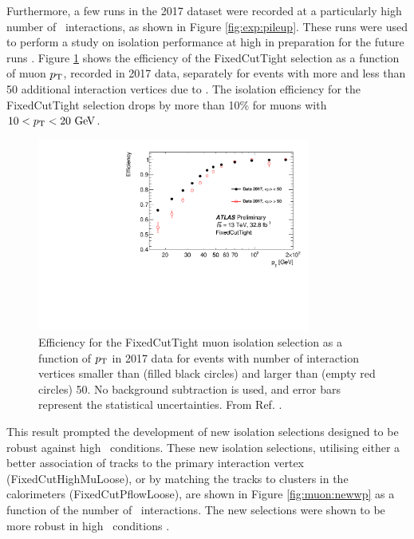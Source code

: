 Furthermore, a few runs in the 2017 dataset were recorded at a particularly high
number of \pileup~interactions, as shown in Figure \ref{fig:exp:pileup}.
These runs were used to perform a study on isolation performance at high
\pileup in preparation for the future runs \cite{Kohler:2293040}.
Figure \ref{fig:muon:highmu} shows the efficiency of the FixedCutTight
selection as a function of muon $p_{\text{T}}$, recorded in 2017 data, separately
for events with more and less than 50 additional interaction vertices
due to \pileup. The  isolation efficiency for the FixedCutTight
selection drops by more than 10\% for muons with $10 < p_{\text{T}} < 20~\text{Ge\kern -0.1em V}$.
\begin{figure}[h!]
  \centering
  \includegraphics[width=0.8\textwidth]{figures/muons/highmu}
  \caption[Muon isolation efficiency at high \pileup.]{Efficiency
  for the FixedCutTight muon isolation selection as a function of $p_{\text{T}}$
  in 2017 data for events with number of interaction vertices smaller
  than (filled black circles) and larger than (empty red circles) 50.
  No background subtraction is used, and error bars represent
  the statistical uncertainties.
  From Ref. \cite{Kohler:2293040}.}
  \label{fig:muon:highmu}
\end{figure}
This result prompted the development of new isolation selections
designed to be robust against high \pileup~conditions. These new
isolation selections, utilising either a better association of tracks
to the primary interaction vertex (FixedCutHighMuLoose), or by matching
the tracks to clusters in the calorimeters (FixedCutPflowLoose), 
are shown in Figure \ref{fig:muon:newwp} as a function of the number
of \pileup~interactions. The new selections were shown to be more
robust in high \pileup~conditions \cite{Zgubic:2320874}.
